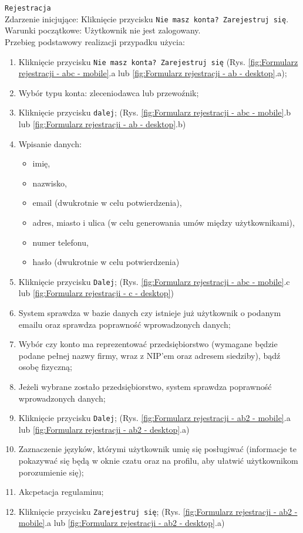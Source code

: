 \texttt{Rejestracja} \\
Zdarzenie inicjujące: Kliknięcie przycisku \texttt{Nie masz konta? Zarejestruj się}. \\
Warunki początkowe: Użytkownik nie jest zalogowany. \\
Przebieg podstawowy realizacji przypadku użycia:
\begin{enumerate}
    \item Kliknięcie przycisku \texttt{Nie masz konta? Zarejestruj się} (Rys. \ref{fig:Formularz rejestracji - abc - mobile}.a lub \ref{fig:Formularz rejestracji - ab - desktop}.a);
    \item Wybór typu konta: zleceniodawca lub przewoźnik;
    \item Kliknięcie przycisku \texttt{dalej}; (Rys. \ref{fig:Formularz rejestracji - abc - mobile}.b lub \ref{fig:Formularz rejestracji - ab - desktop}.b)
    \item Wpisanie danych:
        \begin{itemize}
            \item imię,
            \item nazwisko,
            \item email (dwukrotnie w celu potwierdzenia),
            \item adres, miasto i ulica (w celu generowania umów między użytkownikami),
            \item numer telefonu,
            \item hasło (dwukrotnie w celu potwierdzenia)
        \end{itemize}
    \item Kliknięcie przycisku \texttt{Dalej}; (Rys. \ref{fig:Formularz rejestracji - abc - mobile}.c lub \ref{fig:Formularz rejestracji - c - desktop})
    \item System sprawdza w bazie danych czy istnieje już użytkownik o podanym emailu oraz sprawdza poprawność wprowadzonych danych;
    \item Wybór czy konto ma reprezentować przedsiębiorstwo (wymagane będzie podane pełnej nazwy firmy, wraz z NIP'em oraz adresem siedziby), bądź osobę fizyczną;
    \item Jeżeli wybrane zostało przedsiębiorstwo, system sprawdza poprawność wprowadzonych danych;
    \item Kliknięcie przycisku \texttt{Dalej}; (Rys. \ref{fig:Formularz rejestracji - ab2 - mobile}.a lub \ref{fig:Formularz rejestracji - ab2 - desktop}.a)
    \item Zaznaczenie języków, którymi użytkownik umię się posługiwać (informacje te pokazywać się będą w oknie czatu oraz na profilu, aby ułatwić użytkownikom porozumienie się);
    \item Akcpetacja regulaminu;
    \item Kliknięcie przycisku \texttt{Zarejestruj się}; (Rys. \ref{fig:Formularz rejestracji - ab2 - mobile}.a lub \ref{fig:Formularz rejestracji - ab2 - desktop}.a)
\end{enumerate}
